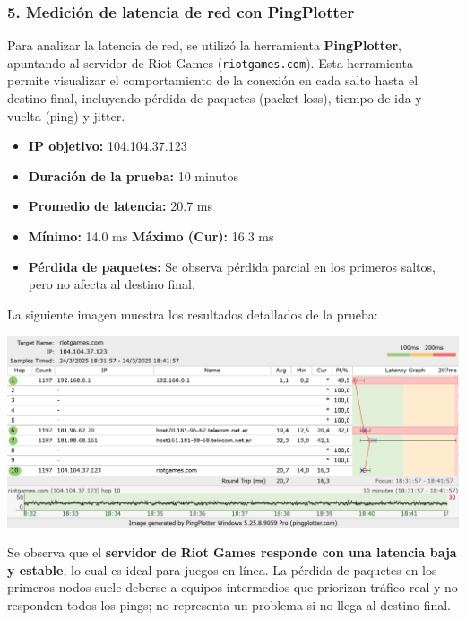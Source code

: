 \subsubsection*{5. Medición de latencia de red con PingPlotter}

Para analizar la latencia de red, se utilizó la herramienta \textbf{PingPlotter}, apuntando al servidor de Riot Games (\texttt{riotgames.com}). Esta herramienta permite visualizar el comportamiento de la conexión en cada salto hasta el destino final, incluyendo pérdida de paquetes (packet loss), tiempo de ida y vuelta (ping) y jitter.

\begin{itemize}
  \item \textbf{IP objetivo:} 104.104.37.123
  \item \textbf{Duración de la prueba:} 10 minutos
  \item \textbf{Promedio de latencia:} 20.7 ms
  \item \textbf{Mínimo:} 14.0 ms \hspace{1cm} \textbf{Máximo (Cur):} 16.3 ms
  \item \textbf{Pérdida de paquetes:} Se observa pérdida parcial en los primeros saltos, pero no afecta al destino final.
\end{itemize}

La siguiente imagen muestra los resultados detallados de la prueba:

\begin{center}
\includegraphics[width=1.05\textwidth]{img/latenciaagu.png}
\end{center}

Se observa que el \textbf{servidor de Riot Games responde con una latencia baja y estable}, lo cual es ideal para juegos en línea. La pérdida de paquetes en los primeros nodos suele deberse a equipos intermedios que priorizan tráfico real y no responden todos los pings; no representa un problema si no llega al destino final.

